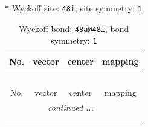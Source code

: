 \documentclass[fleqn,8pt]{jsarticle}
\begin{document}
* Wyckoff site: {\tt 48i}, site symmetry: {\tt 1}
\renewcommand{\arraystretch}{1.2}
\begin{longtable}{cccc}
\caption{Wyckoff bond: {\tt 48a@48i}, bond symmetry: {\tt 1}}
 \\
 \hline \hline
No. & vector & center & mapping \\ \hline \endfirsthead

\multicolumn{3}{l}{\tablename\ \thetable{}} \\
 \hline \hline
No. & vector & center & mapping \\ \hline \endhead

 \hline \hline
\multicolumn{3}{r}{\footnotesize\it continued ...} \\ \endfoot

 \hline \hline
\multicolumn{3}{r}{} \\ \endlastfoot


\end{longtable}
\end{document}

